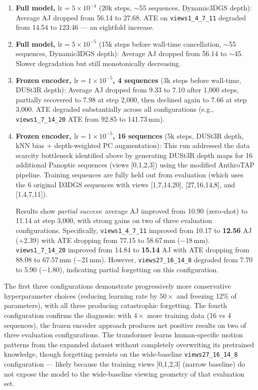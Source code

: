 \documentclass[12pt, a4paper, oneside]{report}
\begin{document}
\begin{enumerate}
    \item \textbf{Full model, $\text{lr} = 5 \times 10^{-4}$} (20k steps, $\sim$55 sequences, Dynamic3DGS depth): Average AJ dropped from 56.14 to 27.68. ATE on \texttt{views1\_4\_7\_11} degraded from 14.54 to 123.46 --- an eightfold increase.
    \item \textbf{Full model, $\text{lr} = 5 \times 10^{-5}$} (15k steps before wall-time cancellation, $\sim$55 sequences, Dynamic3DGS depth): Average AJ dropped from 56.14 to $\sim$45. Slower degradation but still monotonically decreasing.
    \item \textbf{Frozen encoder, $\text{lr} = 1 \times 10^{-5}$, 4 sequences} (3k steps before wall-time, DUSt3R depth): Average AJ dropped from 9.33 to 7.10 after 1,000 steps, partially recovered to 7.98 at step 2,000, then declined again to 7.66 at step 3,000. ATE degraded substantially across all configurations (e.g., \texttt{views1\_7\_14\_20} ATE from 92.85 to 141.73\,mm).

    \item \textbf{Frozen encoder, $\text{lr} = 1 \times 10^{-5}$, 16 sequences} (5k steps, DUSt3R depth, kNN bias + depth-weighted PC augmentation): This run addressed the data scarcity bottleneck identified above by generating DUSt3R depth maps for 16 additional Panoptic sequences (views [0,1,2,3]) using the modified AnthroTAP pipeline. Training sequences are fully held out from evaluation (which uses the 6 original D3DGS sequences with views [1,7,14,20], [27,16,14,8], and [1,4,7,11]).

    Results show \emph{partial success}: average AJ improved from 10.90 (zero-shot) to 11.14 at step 3,000, with strong gains on two of three evaluation configurations. Specifically, \texttt{views1\_4\_7\_11} improved from 10.17 to \textbf{12.56} AJ (+2.39) with ATE dropping from 77.15 to 58.67\,mm ($-$18\,mm). \texttt{views1\_7\_14\_20} improved from 14.84 to \textbf{15.14} AJ with ATE dropping from 88.08 to 67.57\,mm ($-$21\,mm). However, \texttt{views27\_16\_14\_8} degraded from 7.70 to 5.90 ($-$1.80), indicating partial forgetting on this configuration.
\end{enumerate}

The first three configurations demonstrate progressively more conservative hyperparameter choices (reducing learning rate by $50\times$ and freezing 12\% of parameters), with all three producing catastrophic forgetting. The fourth configuration confirms the diagnosis: with $4\times$ more training data (16 vs 4 sequences), the frozen encoder approach produces net positive results on two of three evaluation configurations. The transformer learns human-specific motion patterns from the expanded dataset without completely overwriting its pretrained knowledge, though forgetting persists on the wide-baseline \texttt{views27\_16\_14\_8} configuration --- likely because the training views [0,1,2,3] (narrow baseline) do not expose the model to the wide-baseline viewing geometry of that evaluation set.
\end{document}
